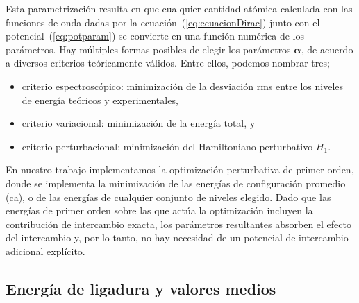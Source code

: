 Esta parametrización resulta en que cualquier cantidad atómica calculada 
con las funciones de onda dadas por la ecuación~(\ref{eq:ecuacionDirac}) 
junto con el potencial~(\ref{eq:potparam}) se convierte en una función 
numérica de los parámetros. Hay múltiples formas posibles de elegir los 
parámetros $\boldsymbol{\alpha}$, de acuerdo a diversos criterios 
teóricamente válidos. Entre ellos, podemos nombrar tres;
\begin{itemize}
\item criterio espectroscópico: minimización de la desviación \acs{rms} 
entre los niveles de energía teóricos y experimentales,
\item criterio variacional: minimización de la energía total, y
\item criterio perturbacional: minimización del Hamiltoniano perturbativo
$H_1$. %
\end{itemize}
En nuestro trabajo implementamos la optimización perturbativa de primer 
orden, donde se implementa la minimización de las energías de 
configuración promedio (\acs{ca}), o de las energías de cualquier 
conjunto de niveles elegido. Dado que las energías de primer orden 
sobre las que actúa la optimización incluyen la contribución de 
intercambio exacta, los parámetros resultantes absorben el efecto del 
intercambio y, por lo tanto, no hay necesidad de un potencial de 
intercambio adicional explícito.

\begin{comment}
El valor esperado de cualquier operador $\hat{A}$ viene dado por
\begin{equation}
 \langle \hat{A}\rangle =
\int_0^{\infty} \left[ P^*(r) \,\hat{A}\, P(r) + Q^*(r)\, \hat{A}\, Q(r)
\right]\,dr
 \label{eq:meanvalr}
\end{equation}
donde $P(r)$ y $Q(r)$ son los componentes fuerte y débil de los 
espinores de Dirac, respectivamente. Para los orbitales relativistas,
usamos la notación $nl\pm$, que significa $nl_j$, donde el índice 
$j=l\pm1/2$ se representa como $\pm$.
\end{comment}

\subsection{Energía de ligadura y valores medios}

